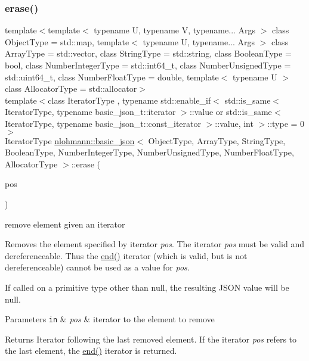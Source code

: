 \subsubsection{\texorpdfstring{erase()}{erase()}\hspace{0.1cm}{\footnotesize\ttfamily [1/4]}}
{\footnotesize\ttfamily template$<$template$<$ typename U, typename V, typename... Args $>$ class Object\+Type = std\+::map, template$<$ typename U, typename... Args $>$ class Array\+Type = std\+::vector, class String\+Type  = std\+::string, class Boolean\+Type  = bool, class Number\+Integer\+Type  = std\+::int64\+\_\+t, class Number\+Unsigned\+Type  = std\+::uint64\+\_\+t, class Number\+Float\+Type  = double, template$<$ typename U $>$ class Allocator\+Type = std\+::allocator$>$ \\
template$<$class Iterator\+Type , typename std\+::enable\+\_\+if$<$ std\+::is\+\_\+same$<$ Iterator\+Type, typename basic\+\_\+json\+\_\+t\+::iterator $>$\+::value or std\+::is\+\_\+same$<$ Iterator\+Type, typename basic\+\_\+json\+\_\+t\+::const\+\_\+iterator $>$\+::value, int $>$\+::type  = 0$>$ \\
Iterator\+Type \hyperlink{classnlohmann_1_1basic__json}{nlohmann\+::basic\+\_\+json}$<$ Object\+Type, Array\+Type, String\+Type, Boolean\+Type, Number\+Integer\+Type, Number\+Unsigned\+Type, Number\+Float\+Type, Allocator\+Type $>$\+::erase (\begin{DoxyParamCaption}\item[{Iterator\+Type}]{pos }\end{DoxyParamCaption})\hspace{0.3cm}{\ttfamily [inline]}}



remove element given an iterator 

Removes the element specified by iterator {\itshape pos}. The iterator {\itshape pos} must be valid and dereferenceable. Thus the {\ttfamily \hyperlink{classnlohmann_1_1basic__json_a12ccf14d39ddae52f6c7e126105a230b}{end()}} iterator (which is valid, but is not dereferenceable) cannot be used as a value for {\itshape pos}.

If called on a primitive type other than {\ttfamily null}, the resulting J\+S\+ON value will be {\ttfamily null}.


\begin{DoxyParams}[1]{Parameters}
\mbox{\tt in}  & {\em pos} & iterator to the element to remove \\
\hline
\end{DoxyParams}
\begin{DoxyReturn}{Returns}
Iterator following the last removed element. If the iterator {\itshape pos} refers to the last element, the {\ttfamily \hyperlink{classnlohmann_1_1basic__json_a12ccf14d39ddae52f6c7e126105a230b}{end()}} iterator is returned.
\end{DoxyReturn}

